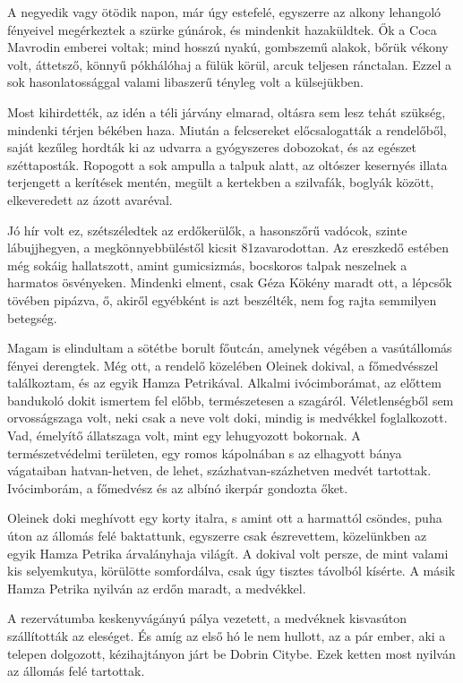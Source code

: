 \documentclass{IEEEtran}
\begin{document}
A negyedik vagy ötödik napon, már úgy estefelé, egyszerre az alkony lehangoló
fényeivel megérkeztek a szürke gúnárok, és mindenkit hazaküldtek. Ők a Coca
Mavrodin emberei voltak; mind hosszú nyakú, gombszemű alakok, bőrük vékony
volt, áttetsző, könnyű pókhálóhaj a fülük körül, arcuk teljesen ránctalan.
Ezzel a sok hasonlatossággal valami libaszerű tényleg volt a külsejükben.

Most kihirdették, az idén a téli járvány elmarad, oltásra sem lesz tehát
szükség, mindenki térjen békében haza. Miután a felcsereket előcsalogatták a
rendelőből, saját kezűleg hordták ki az udvarra a gyógyszeres dobozokat, és az
egészet széttaposták. Ropogott a sok ampulla a talpuk alatt, az oltószer
kesernyés illata terjengett a kerítések mentén, megült a kertekben a
szilvafák, boglyák között, elkeveredett az ázott avaréval.

Jó hír volt ez, szétszéledtek az erdőkerülők, a hasonszőrű vadócok, szinte
lábujjhegyen, a megkönnyebbüléstől kicsit 81zavarodottan. Az ereszkedő estében
még sokáig hallatszott, amint gumicsizmás, bocskoros talpak neszelnek a
harmatos ösvényeken. Mindenki elment, csak Géza Kökény maradt ott, a lépcsők
tövében pipázva, ő, akiről egyébként is azt beszélték, nem fog rajta semmilyen
betegség.

Magam is elindultam a sötétbe borult főutcán, amelynek végében a vasútállomás
fényei derengtek. Még ott, a rendelő közelében Oleinek dokival, a főmedvésszel
találkoztam, és az egyik Hamza Petrikával. Alkalmi ivócimborámat, az előttem
bandukoló dokit ismertem fel előbb, természetesen a szagáról. Véletlenségből
sem orvosságszaga volt, neki csak a neve volt doki, mindig is medvékkel
foglalkozott. Vad, émelyítő állatszaga volt, mint egy lehugyozott bokornak. A
természetvédelmi területen, egy romos kápolnában s az elhagyott bánya
vágataiban hatvan-hetven, de lehet, százhatvan-százhetven medvét tartottak.
Ivócimborám, a főmedvész és az albínó ikerpár gondozta őket.

Oleinek doki meghívott egy korty italra, s amint ott a harmattól csöndes, puha
úton az állomás felé baktattunk, egyszerre csak észrevettem, közelünkben az
egyik Hamza Petrika árvalányhaja világít. A dokival volt persze, de mint
valami kis selyemkutya, körülötte somfordálva, csak úgy tisztes távolból
kísérte. A másik Hamza Petrika nyilván az erdőn maradt, a medvékkel.

A rezervátumba keskenyvágányú pálya vezetett, a medvéknek kisvasúton
szállították az eleséget. És amíg az első hó le nem hullott, az a pár ember,
aki a telepen dolgozott, kézihajtányon járt be Dobrin Citybe. Ezek ketten most
nyilván az állomás felé tartottak.
\end{document}
